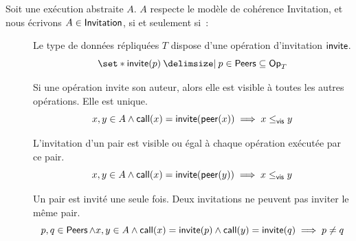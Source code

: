 \begin{definition}[Invitation]\label{def:invitation-consistency}
Soit une exécution abstraite $A$. $A$ respecte le modèle de cohérence Invitation, et nous écrivons $A \in \operatorname{\mathsf{Invitation}}$, si et seulement si~:
\begin{description}
  \item[]
  Le type de données répliquées $T$ dispose d'une opération d'invitation $\operatorname{\mathsf{invite}}$.
  \begin{equation*}
  \set*{\trm{invite}(p) \given p \in \trm{Peers}} \subseteq \trm{Op}_T
  \end{equation*}

  \item[]
  Si une opération invite son auteur, alors elle est visible à toutes les autres opérations.
  Elle est unique.
  \begin{equation*}
      x, y \in A \land \operatorname{\mathsf{call}}(x) = \operatorname{\mathsf{invite}}(\operatorname{\mathsf{peer}}(x)) \implies x \leq_{\operatorname{\mathsf{vis}}} y 
  \end{equation*}

  \item[]
  L'invitation d'un pair est visible ou égal à chaque opération exécutée par ce pair.
  \begin{equation*}
      x, y \in A \land \operatorname{\mathsf{call}}(x) = \operatorname{\mathsf{invite}}(\operatorname{\mathsf{peer}}(y)) \implies x \leq_{\operatorname{\mathsf{vis}}} y
  \end{equation*}

  \item[]
  Un pair est invité une seule fois.
  Deux invitations ne peuvent pas inviter le même pair.
  \begin{equation*}
      p, q \in \operatorname{\mathsf{Peers}} \land x, y \in A \land \operatorname{\mathsf{call}}(x) = \operatorname{\mathsf{invite}}(p) \land \operatorname{\mathsf{call}}(y) = \operatorname{\mathsf{invite}}(q) \implies p \neq q
  \end{equation*}
  \end{description}
\end{definition}


